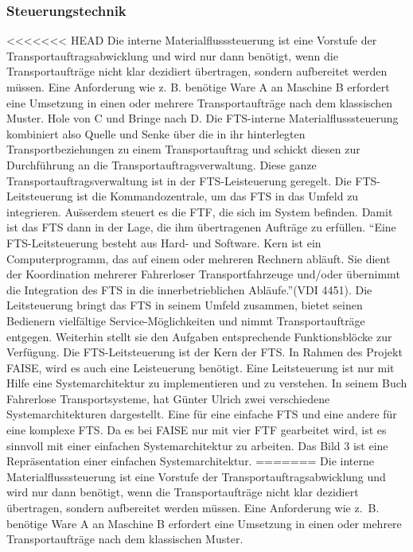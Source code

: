 \begin{itemize}
\subsubsection{Steuerungstechnik}
<<<<<<< HEAD
Die interne Materialflusssteuerung ist eine Vorstufe der Transportauftragsabwicklung und wird nur dann ben\"otigt, wenn die Transportauftr\"age nicht klar dezidiert \"ubertragen, sondern aufbereitet werden m\"ussen. Eine Anforderung wie z. B. ben\"otige Ware A an Maschine B erfordert eine Umsetzung in einen oder mehrere Transportauftr\"age nach dem klassischen Muster. Hole von C und Bringe nach D. Die FTS-interne Materialflusssteuerung kombiniert also Quelle und Senke \"uber die in ihr hinterlegten Transportbeziehungen zu einem Transportauftrag und schickt diesen zur Durchf\"uhrung an die Transportauftragsverwaltung. Diese ganze Transportauftragsverwaltung ist in der FTS-Leisteuerung geregelt. 
Die FTS-Leitsteuerung ist die Kommandozentrale, um das FTS in das Umfeld zu integrieren. Au\"sserdem steuert es die FTF, die sich im System befinden. Damit ist das FTS dann in der 
Lage, die ihm \"ubertragenen Auftr\"age zu erf\"ullen. "`Eine FTS-Leitsteuerung besteht aus Hard- und Software. Kern ist ein Computerprogramm, das auf einem oder mehreren Rechnern abl\"auft. Sie dient der Koordination mehrerer Fahrerloser Transportfahrzeuge und/oder \"ubernimmt die Integration des FTS in die innerbetrieblichen Abl\"aufe."'(VDI 4451). Die Leitsteuerung bringt das FTS in seinem Umfeld zusammen, bietet seinen Bedienern vielf\"altige Service-M\"oglichkeiten und nimmt Transportauftr\"age entgegen. Weiterhin stellt sie den Aufgaben entsprechende Funktionsbl\"ocke zur Verf\"ugung. 
Die FTS-Leitsteuerung ist der Kern der FTS. In Rahmen des Projekt FAISE, wird es auch eine Leisteuerung ben\"otigt. Eine Leitsteuerung ist nur mit Hilfe eine Systemarchitektur zu implementieren und zu verstehen. In seinem Buch Fahrerlose Transportsysteme, hat G\"unter Ulrich zwei verschiedene Systemarchitekturen dargestellt. Eine f\"ur eine einfache FTS und eine andere f\"ur eine komplexe FTS. Da es bei FAISE nur mit vier FTF gearbeitet wird, ist es sinnvoll mit einer einfachen Systemarchitektur zu arbeiten. Das Bild 3 ist eine Repr\"asentation einer einfachen Systemarchitektur.
=======
Die interne Materialflusssteuerung ist eine Vorstufe der Transportauftragsabwicklung und wird nur dann ben\"otigt, wenn die Transportauftr\"age nicht klar dezidiert \"ubertragen, sondern aufbereitet werden m\"ussen.
Eine Anforderung wie z.~B. ben\"otige Ware A an Maschine B erfordert eine Umsetzung in einen oder mehrere Transportauftr\"age nach dem klassischen Muster.

\end{itemize}
